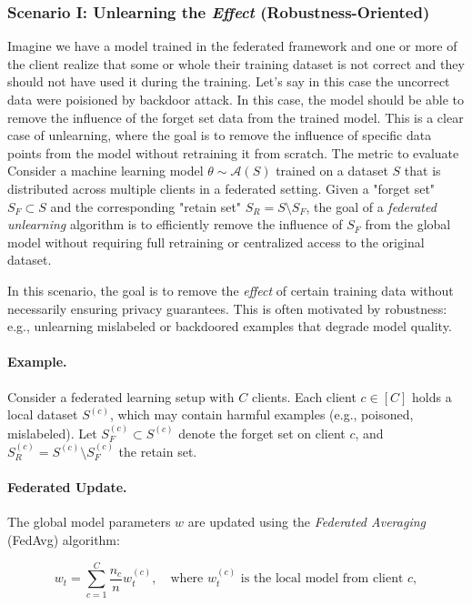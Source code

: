 \documentclass{article} %
\begin{document}
\subsubsection{Scenario I: Unlearning the \textit{Effect} (Robustness-Oriented)}
Imagine we have a model trained in the federated framework and one or more of the client realize that some or whole their training dataset is not correct and they should not have used it during the training. Let's say in this case the uncorrect data were poisioned by backdoor attack. In this case, the model should be able to remove the influence of the forget set data from the trained model. This is a clear case of unlearning, where the goal is to remove the influence of specific data points from the model without retraining it from scratch.
The metric to evaluate
Consider a machine learning model $\theta \sim \mathcal{A}(S)$ trained on a dataset $S$ that is distributed across multiple clients in a federated setting. Given a "forget set" $S_F \subset S$ and the corresponding "retain set" $S_R = S \setminus S_F$, the goal of a \textit{federated unlearning} algorithm is to efficiently remove the influence of $S_F$ from the global model without requiring full retraining or centralized access to the original dataset.


In this scenario, the goal is to remove the \textit{effect} of certain training data without necessarily ensuring privacy guarantees. This is often motivated by robustness: e.g., unlearning mislabeled or backdoored examples that degrade model quality.

\paragraph{Example.} Consider a federated learning setup with $C$ clients. Each client $c \in [C]$ holds a local dataset $S^{(c)}$, which may contain harmful examples (e.g., poisoned, mislabeled). Let $S_{F}^{(c)} \subset S^{(c)}$ denote the forget set on client $c$, and $S_{R}^{(c)} = S^{(c)} \setminus S_{F}^{(c)}$ the retain set.

\paragraph{Federated Update.} The global model parameters $w$ are updated using the \textit{Federated Averaging} (FedAvg) algorithm:

\[
w_t = \sum_{c=1}^C \frac{n_c}{n} w_t^{(c)}, \quad \text{where } w_t^{(c)} \text{ is the local model from client } c,
\]
\end{document}
